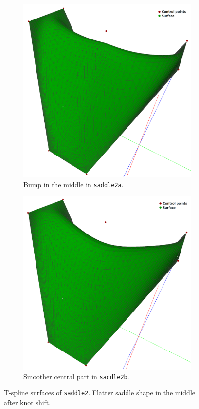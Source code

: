 \documentclass{article}
\begin{document}
\begin{figure}[H]
\centering
\begin{subfigure}[b]{0.48\textwidth}
\includegraphics[width=\textwidth]{saddle2a}
\caption{Bump in the middle in \texttt{saddle2a}.}
\label{saddle2a}
\end{subfigure}
\begin{subfigure}[b]{0.48\textwidth}
\includegraphics[width=\textwidth]{saddle2b}
\caption{Smoother central part in \texttt{saddle2b}.}
\label{saddle2b}
\end{subfigure}
\caption{T-spline surfaces of \texttt{saddle2}. Flatter saddle shape in the middle after knot shift.}
\label{saddle2}
\end{figure}
\end{document}

